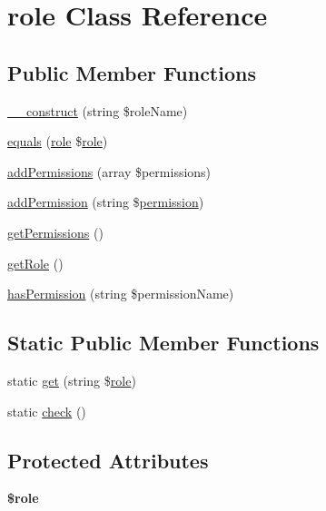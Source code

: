 \hypertarget{classcommon_1_1user_1_1role}{\section{role \-Class \-Reference}
\label{classcommon_1_1user_1_1role}
}
\subsection*{\-Public \-Member \-Functions}
\begin{DoxyCompactItemize}
\item 
\hyperlink{classcommon_1_1user_1_1role_a0fe6fe9dff99830d0b7bb71f2877f3e3}{\-\_\-\-\_\-construct} (string \$role\-Name)
\item 
\hyperlink{classcommon_1_1user_1_1role_a96d7229cb9b1d75345cfac9f683ca398}{equals} (\hyperlink{classcommon_1_1user_1_1role}{role} \$\hyperlink{classcommon_1_1user_1_1role}{role})
\item 
\hyperlink{classcommon_1_1user_1_1role_a32bcfee1aac89ef68ed2494b3402ea47}{add\-Permissions} (array \$permissions)
\item 
\hyperlink{classcommon_1_1user_1_1role_a185e9ed46609058776b2f27429c34fd6}{add\-Permission} (string \$\hyperlink{classcommon_1_1user_1_1permission}{permission})
\item 
\hyperlink{classcommon_1_1user_1_1role_a98e8f81c4e0869a6adf4a36ca1a6860a}{get\-Permissions} ()
\item 
\hyperlink{classcommon_1_1user_1_1role_a0b2e7098f1c48a7439a42bada5b69689}{get\-Role} ()
\item 
\hyperlink{classcommon_1_1user_1_1role_aaaa6de319c1361e48f90c59048755e86}{has\-Permission} (string \$permission\-Name)
\end{DoxyCompactItemize}
\subsection*{\-Static \-Public \-Member \-Functions}
\begin{DoxyCompactItemize}
\item 
static \hyperlink{classcommon_1_1user_1_1role_a2635489967ff48beefcd67afbdcec1ba}{get} (string \$\hyperlink{classcommon_1_1user_1_1role}{role})
\item 
static \hyperlink{classcommon_1_1user_1_1role_a3a934bd1e982502106ee5dfac2e4e2ed}{check} ()
\end{DoxyCompactItemize}
\subsection*{\-Protected \-Attributes}
\begin{DoxyCompactItemize}
\item 
\hypertarget{classcommon_1_1user_1_1role_a1ea903cca285c7c0b4c9203932100309}{{\bfseries \$role}}\label{classcommon_1_1user_1_1role_a1ea903cca285c7c0b4c9203932100309}

\end{DoxyCompactItemize}


